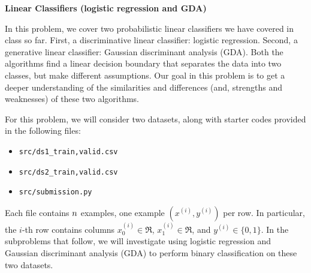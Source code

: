 \item {\bf Linear Classifiers (logistic regression and GDA)}

In this problem, we cover two probabilistic linear classifiers we have covered in class so far. First, a discriminative linear classifier: logistic regression. Second, a generative linear classifier: Gaussian discriminant analysis (GDA). Both the algorithms find a linear decision boundary that separates the data into two classes, but make different assumptions. Our goal in this problem is to get a deeper understanding of the similarities and differences (and, strengths and weaknesses) of these two algorithms.

For this problem, we will consider two datasets, along with starter codes provided in the following files:
\begin{center}
\begin{itemize}
	\item \texttt{src/ds1\_{train,valid}.csv}
	\item \texttt{src/ds2\_{train,valid}.csv}
  \item \texttt{src/submission.py}
\end{itemize}
\end{center}
Each file contains ${n}$ examples, one example $(x^{(i)}, y^{(i)})$ per row. In particular, the $i$-th row contains columns $x^{(i)}_0\in\Re$, $x^{(i)}_1\in\Re$, and $y^{(i)}\in\{0, 1\}$. In the subproblems that follow, we will investigate using logistic regression and Gaussian discriminant analysis (GDA) to perform binary classification on these two datasets.

\begin{enumerate}
	
	
	
	
	
	
	
	
\end{enumerate}
